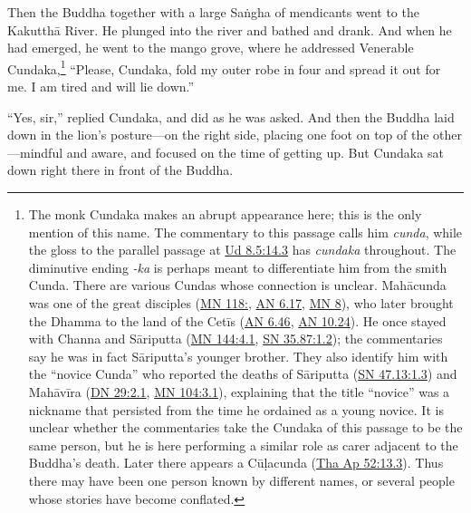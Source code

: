 \documentclass[12pt,openany]{book}%
\begin{document}
Then the Buddha together with a large \textsanskrit{Saṅgha} of mendicants went to the \textsanskrit{Kakutthā} River. He plunged into the river and bathed and drank. And when he had emerged, he went to the mango grove, where he addressed Venerable Cundaka,\footnote{The monk Cundaka makes an abrupt appearance here; this is the only mention of this name. The commentary to this passage calls him \textit{cunda}, while the gloss to the parallel passage at \href{https://suttacentral.net/ud8.5/en/sujato\#14.3}{Ud 8.5:14.3} has \textit{cundaka} throughout. The diminutive ending \textit{-ka} is perhaps meant to differentiate him from the smith Cunda. There are various Cundas whose connection is unclear. \textsanskrit{Mahācunda} was one of the great disciples (\href{https://suttacentral.net/mn118/en/sujato}{MN 118:}, \href{https://suttacentral.net/an6.17/en/sujato}{AN 6.17}, \href{https://suttacentral.net/mn8/en/sujato}{MN 8}), who later brought the Dhamma to the land of the \textsanskrit{Cetīs} (\href{https://suttacentral.net/an6.46/en/sujato}{AN 6.46}, \href{https://suttacentral.net/an10.24/en/sujato}{AN 10.24}). He once stayed with Channa and \textsanskrit{Sāriputta} (\href{https://suttacentral.net/mn144/en/sujato\#4.1}{MN 144:4.1}, \href{https://suttacentral.net/sn35.87/en/sujato\#1.2}{SN 35.87:1.2}); the commentaries say he was in fact \textsanskrit{Sāriputta}’s younger brother. They also identify him with the “novice Cunda” who reported the deaths of \textsanskrit{Sāriputta} (\href{https://suttacentral.net/sn47.13/en/sujato\#1.3}{SN 47.13:1.3}) and \textsanskrit{Mahāvīra} (\href{https://suttacentral.net/dn29/en/sujato\#2.1}{DN 29:2.1}, \href{https://suttacentral.net/mn104/en/sujato\#3.1}{MN 104:3.1}), explaining that the title “novice” was a nickname that persisted from the time he ordained as a young novice. It is unclear whether the commentaries take the Cundaka of this passage to be the same person, but he is here performing a similar role as carer adjacent to the Buddha’s death. Later there appears a \textsanskrit{Cūḷacunda} (\href{https://suttacentral.net/tha-ap52/en/sujato\#13.3}{Tha Ap 52:13.3}). Thus there may have been one person known by different names, or several people whose stories have become conflated. } “Please, Cundaka, fold my outer robe in four and spread it out for me. I am tired and will lie down.” 

“Yes, sir,” replied Cundaka, and did as he was asked. And then the Buddha laid down in the lion’s posture—on the right side, placing one foot on top of the other—mindful and aware, and focused on the time of getting up. But Cundaka sat down right there in front of the Buddha. 
\end{document}

